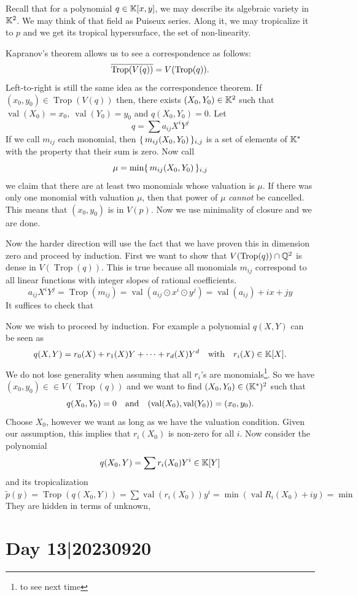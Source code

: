 \documentclass[12pt]{memoir}
\DeclareMathOperator{\val}{val}
\DeclareMathOperator{\Trop}{Trop}
\begin{document}
Recall that for a polynomial $q\in\mathbb{K}[x,y]$, we may describe its algebraic variety in $\mathbb{K}^2$. We may think of that field as Puiseux series. Along it, we may tropicalize it to $p$ and we get its tropical hypersurface, the set of non-linearity.\par
Kapranov's theorem allows us to see a correspondence as follows:
$$\ov{\Trop(V(q))}=V(\Trop(q)).$$
Left-to-right is still the same idea as the correspondence theorem. If $(x_0,y_0)\in\Trop(V(q))$ then, there exists $(X_0,Y_0)\in\mathbb{K}^2$ such that $\val(X_0)=x_0,\ \val(Y_0)=y_0$ and $q(X_0,Y_0)=0$. Let 
$$q=\sum a_{ij}X^iY^j$$
If we call $m_{ij}$ each monomial, then $\{\,m_{ij}(X_0,Y_0)\,\}_{i,j}$ is a set of elements of $\mathbb{K}^\ast$ with the property that their sum is zero. Now call 
$$\mu=\min\{\,m_{ij}(X_0,Y_0)\,\}_{i,j}$$
we claim that there are at least two monomials whose valuation is $\mu$. If there was only one monomial with valuation $\mu$, then that power of $\mu$ \emph{cannot} be cancelled. This means that $(x_0,y_0) $ is in $V(p)$. Now we use minimality of closure and we are done.\par 
Now the harder direction will use the fact that we have proven this in dimension zero and proceed by induction. First we want to show that $V(\Trop(q))\cap\bQ^2$ is dense in $V(\Trop(q))$. This is true because all monomials $m_{ij}$ correspond to all linear functions with integer slopes of rational coefficients.
$$a_{ij}X^iY^j=\Trop(m_{ij})=\val(a_{ij}\odot x^{i}\odot y^j)=\val(a_{ij})+ix+jy$$
It suffices to check that \par 
Now we wish to proceed by induction. For example a polynomial $q(X,Y)$ can be seen as 
$$q(X,Y)=r_0(X)+r_1(X)Y+\dots+r_d(X)Y^d\quad\text{with}\quad r_i(X)\in\mathbb{K}[X].$$
We do not lose generality when assuming that all $r_i$'s are monomials\footnote{to see next time}. So we have $(x_0,y_0)\in\in V(\Trop(q))$ and we want to find $(X_0,Y_0)\in(\mathbb{K}^\ast)^2$ such that 
$$q(X_0,Y_0)=0\word{and}(\val(X_0),\val(Y_0))=(x_0,y_0).$$
Choose $X_0$, however we want as long as we have the valuation condition. Given our assumption, this implies that $r_i(X_0)$ is non-zero for all $i$. Now consider the polynomial 
$$q(X_0,Y)=\sum r_i(X_0)Y^i\in\mathbb{K}[Y]$$
and its tropicalization
$\tilde{p}(y)=\Trop(q(X_0,Y))=\sum\val(r_i(X_0))y^i=\min(\val R_i(X_0)+iy)=\min$
They are hidden in terms of unknown,

\section{Day 13|20230920}
\end{document}
